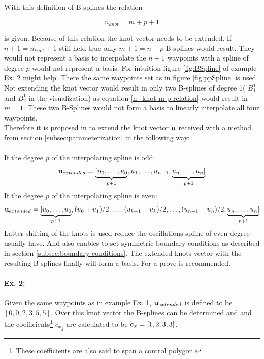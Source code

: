 With this definition of B-splines the relation
 
\begin{equation}
\label{n_knot-m-p-relation}
n_{knot}=m+p+1
\end{equation} 

is given. Because of this relation the knot vector needs to be extended. If $n+1=n_{knot}+1$ still held true only $m+1=n-p$ B-splines would result. They would not represent a basis to interpolate the $n+1$ waypoints with a spline of degree $p$ would not represent a basis. For intuition figure \ref{fig:BSpline} of example  Ex. 2 might help. There the same waypoints set as in figure \ref{fig:ppSpline} is used. Not extending the knot vector would result in only two B-splines of degree 1( $B_1^1$ and $B_2^1$ in the visualization) as equation \eqref{n_knot-m-p-relation} would result in $m=1$. These two B-Splines would not form a basis to linearly interpolate all four waypoints. \\
Therefore it is proposed in \cite{biagiotti} to extend the knot vector ${\bf u}$ received with a method from section \ref{subsec:parameterization} in the following way:\\
\\
If the degree $p$ of the interpolating spline is odd:
\begin{equation}
{\bf u}_{extended}= \underbrace{ [u_0,\ldots,u_0}_{p+1},u_1, \ldots,u_{n-1},\underbrace{u_n,\ldots, u_n ]}_{p+1} 
\end{equation}
If the degree $p$ of the interpolating spline is even:
\begin{equation}
{\bf u}_{extended}= \underbrace{ [u_0,\ldots,u_0}_{p+1},(u_0+u_1)/2, \ldots, (u_{k-1}-u_k)/2, \ldots,(u_{n-1}+u_n)/2,\underbrace{u_n,\ldots, u_n ]}_{p+1} 
\end{equation} 
Latter shifting of the knots is used reduce the oscillations spline of even degree usually have. And also enables to set symmetric boundary conditions as described in section \ref{subsec:boundary conditions}. The extended knots vector with the resulting B-splines finally will form a basis. For a prove \cite{dahmen} is recommended.

\paragraph{Ex. 2:}
Given the same waypoints as in example Ex. 1, ${\bf u}_{extended}$ is defined to be $[0,0,2,3,5,5]$. Over this knot vector the B-splines can be determined and and the coefficients\footnote{These coefficients are also said to span a control polygon.} ${c_x}_j$ are calculated to be ${\bf c}_x=[1,2,3,3]$.

